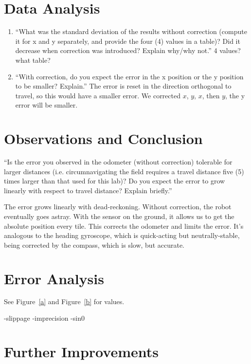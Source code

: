 \documentclass[twocolumn]{article}
\begin{document}
\section{Data Analysis}

\begin{enumerate}
\item ``What was the standard deviation of the results without correction (compute it for x and y separately, and provide the four (4) values in a table)? Did it decrease when correction was introduced? Explain why/why not.\cite{lab2}'' 4 values? what table?
\item ``With correction, do you expect the error in the x position or the y position to be smaller? Explain.'' The error is reset in the direction orthogonal to travel, so this would have a smaller error. We corrected $x$, $y$, $x$, then $y$, the y error will be smaller.
\end{enumerate}

\section{Observations and Conclusion}

``Is the error you observed in the odometer (without correction) tolerable for larger distances (i.e. circumnavigating the field requires a travel distance five (5) times larger than that used for this lab)? Do you expect the error to grow linearly with respect to travel distance? Explain briefly.\cite{lab2}''

The error grows linearly with dead-reckoning. Without correction, the robot eventually goes astray. With the sensor on the ground, it allows us to get the absolute position every tile. This corrects the odometer and limits the error. It's analogous to the heading gyroscope, which is quick-acting but neutrally-stable, being corrected by the compass, which is slow, but accurate.

\section{Error Analysis}

See Figure~\ref{a} and Figure~\ref{b} for values.

-slippage
-imprecision
-sin0

\section{Further Improvements}
\end{document}

